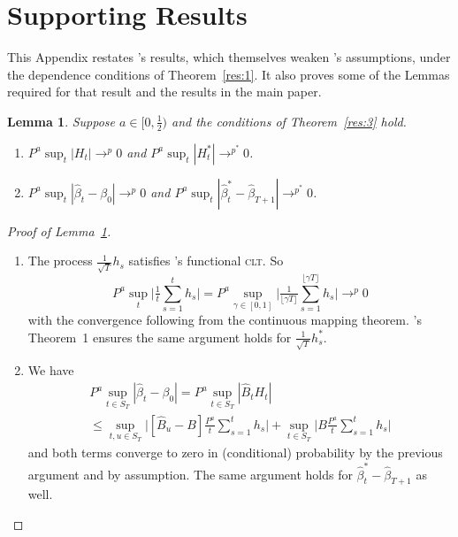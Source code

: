 \documentclass[12pt,fleqn]{article}
\newcommand\citepos[2][]{\citeauthor{#2}'s \citeyearpar[#1]{#2}}
\newtheorem{lema}{Lemma}[section]
\theoremstyle{definition}
\newcommand{\clt}{\textsc{clt}}
\begin{document}
\appendix
\section{Supporting Results}
This Appendix restates \citepos{Mcc:00} results, which themselves
weaken \citepos{Wes:96} assumptions, under the dependence conditions
of Theorem~\ref{res:1}.  It also proves some of the Lemmas required
for that result and the results in the main paper.

\begin{lema}\label{res:a2}
  Suppose $a \in [0,\frac12)$ and the conditions of Theorem~\ref{res:3}
  hold.
  \begin{enumerate}
  \item $P^a \sup_t | H_{t} | \to^p 0$ and $P^a \sup_t | H_{t}^{*} |
    \to^{p^{*}} 0$.
  \item $P^a \sup_t | \hat{\beta}_{t} - \beta_{0} | \to^{p} 0$ and
    $P^a \sup_t | \hat{\beta}^{*}_{t} - \hat{\beta}_{T+1} |
    \to^{p^{*}} 0$.
  \end{enumerate}
\end{lema}

\begin{proof}[Proof of Lemma~\ref{res:a2}] \quad
  \begin{enumerate}
  \item The process $\tfrac{1}{\sqrt{T}} h_{s}$ satisfies \citepos[Theorem
    3.1]{JoD:00b} functional \clt.  So
    \begin{equation}
      P^a \sup_t \Big| \tfrac1t \sum_{s=1}^t h_{s} \Big| =
      P^a \sup_{\gamma \in [0,1]} \Big| \tfrac{1}{\lfloor \gamma
        T\rfloor} \sum_{s=1}^{\lfloor \gamma T \rfloor} h_{s} \Big| \to^{p} 0
    \end{equation}
    with the convergence following from the continuous mapping
    theorem.  \citepos{Cal:11d} Theorem~1 ensures the same argument
    holds for $\tfrac{1}{\sqrt{T}} h_s^{*}$.
  \item We have
    \begin{multline}
      P^a \sup_{t \in S_T} | \hat{\beta}_t - \beta_0 | = P^a \sup_{t
        \in S_T} |\hat{B}_{t} H_{t}| \\ \leq \sup_{t,u \in S_T} \Big|
      [ \hat{B}_u - B] \tfrac{P^a}{t} \sum_{s=1}^t h_{s} \Big| + \sup_{t\in S_T} \Big|
      B \tfrac{P^a}{t} \sum_{s=1}^t h_{s} \Big|
    \end{multline}
    and both terms converge to zero in (conditional) probability by
    the previous argument and by assumption.  The same argument holds
    for $\hat{\beta}_t^{*} - \hat{\beta}_{T+1}$ as well.
  \end{enumerate}
\end{proof}
\end{document}
